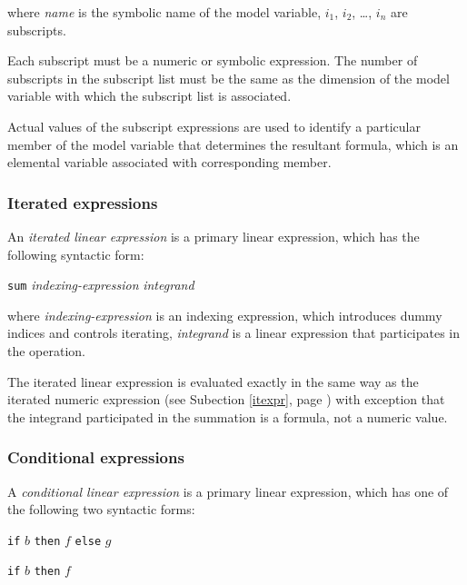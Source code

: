 \documentclass[10pt]{article}
\begin{document}
\medskip

\noindent where {\it name} is the symbolic name of the model variable,
$i_1$, $i_2$, \dots, $i_n$ are subscripts.

Each subscript must be a numeric or symbolic expression. The number of
subscripts in the subscript list must be the same as the dimension of
the model variable with which the subscript list is associated.

Actual values of the subscript expressions are used to identify a
particular member of the model variable that determines the resultant
formula, which is an elemental variable associated with corresponding
member.

\subsubsection{Iterated expressions}

An {\it iterated linear expression} is a primary linear expression,
which has the following syntactic form:

\medskip

\noindent\hfil
{\tt sum} {\it indexing-expression} {\it integrand}

\medskip

\noindent where {\it indexing-expression} is an indexing expression,
which introduces dummy indices and controls iterating, {\it integrand}
is a linear expression that participates in the operation.

The iterated linear expression is evaluated exactly in the same way as
the iterated numeric expression (see Subection \ref{itexpr}, page
\pageref{itexpr}) with exception that the integrand participated in the
summation is a formula, not a numeric value.

\subsubsection{Conditional expressions}

A {\it conditional linear expression} is a primary linear expression,
which has one of the following two syntactic forms:

\medskip

\noindent\hfil
{\tt if} $b$ {\tt then} $f$ {\tt else} $g$

\medskip

\noindent\hspace{127pt}
{\tt if} $b$ {\tt then} $f$

\medskip
\end{document}
